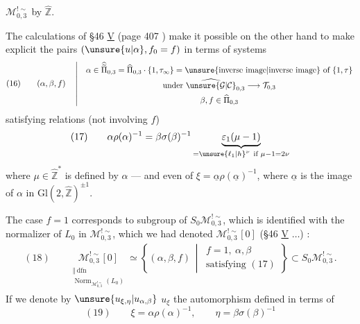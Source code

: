 $\mathcal M_{0,3}^{!\sim}$ by $\widehat{\mathbb Z}$.

The calculations of \S 46 \uline{V} (page 407 ) make it possible on the other hand to make explicit the pairs $(\unsure{u|\alpha},f_0=f)$ in terms of systems
\[
(16)\qquad
(\alpha,\beta,f)\quad\left|\quad
\begin{gathered}
\alpha\in\widehat{\widetilde{\Pi}}_{0,3}
 =\widehat{\Pi}_{0,3}\cdot\{1,\tau_\infty\}
 =\text{\unsure{inverse image|inverse image} of }\{1,\tau\}\\
\text{under }\widehat{\unsure{\mathcal G|\mathcal C}}_{0,3}\longrightarrow\mathcal T_{0,3}\\
\beta,f\in\widehat{\Pi}_{0,3}
\end{gathered}\right.
\]
satisfying relations (not involving $f$)
\[
(17)\qquad
\alpha\rho(\alpha)^{-1}
 =\beta\sigma(\beta)^{-1}
 \underbrace{\varepsilon_1(\mu-1)}_{=\unsure{\ell_1|h}^{\nu}\ \text{if }\mu-1=2\nu}
\]
where $\mu\in\widehat{\mathbb Z}^{*}$ is defined   by $\alpha$ --- and even   of $\xi=\underline\alpha\rho(\underline\alpha)^{-1}$, where $\underline\alpha$ is the image of $\alpha$ in $\mathrm{Gl}(2,\widehat{\mathbb Z})^{\pm1}$.

The case $f=1$ corresponds to  subgroup of $S_0\mathcal M_{0,3}^{!\sim}$, which is identified with the normalizer of $L_0$ in $\mathcal M_{0,3}^{!\sim}$, which we had denoted $\mathcal M_{0,3}^{!\sim}[0]$ (\S 46 \uline{V} $\ldots$) :
\[
\begin{gathered}
(18)\qquad
\underset{\substack{\Vert\ \mathrm{dfn}\\
\operatorname{Norm}_{\mathcal M_{0,3}^{!\sim}}(L_0)}}{\mathcal M_{0,3}^{!\sim}[0]}
\simeq
\left\{(\alpha,\beta,f)\,\middle|\,
\begin{array}{l}f=1,\ \alpha,\beta\\\text{satisfying }(17)\end{array}\right\}
\subset S_0\mathcal M_{0,3}^{!\sim} .
\end{gathered}
\]
If we denote by $\unsure{u_{\xi,\eta}|u_{\alpha,\beta}}$    $u_\xi$ the automorphism defined in terms of
\[
(19)\qquad
\xi=\alpha\rho(\alpha)^{-1},\qquad
\eta=\beta\sigma(\beta)^{-1}
\]

